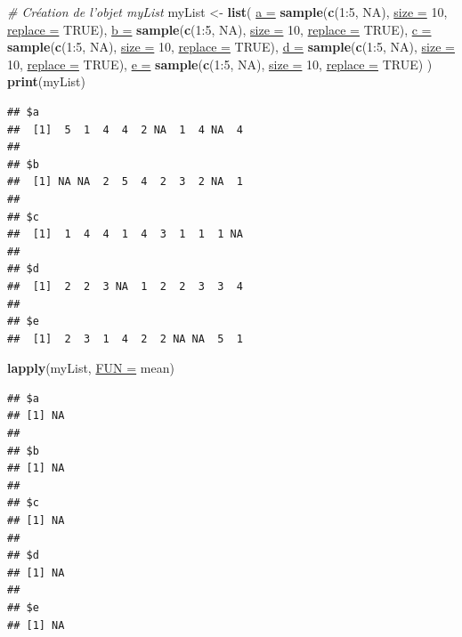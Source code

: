 \documentclass[twoside,symmetric]{book}
\newenvironment{Shaded}{}{}
\newcommand{\CommentTok}[1]{\textit{#1}}
\newcommand{\DataTypeTok}[1]{\underline{#1}}
\newcommand{\DecValTok}[1]{#1}
\newcommand{\KeywordTok}[1]{\textbf{#1}}
\newcommand{\NormalTok}[1]{#1}
\newcommand{\OperatorTok}[1]{#1}
\newcommand{\OtherTok}[1]{#1}
\newcommand{\StringTok}[1]{#1}
\begin{document}
\begin{Shaded}
\begin{Highlighting}[]
\CommentTok{# Création de l'objet myList}
\NormalTok{myList <-}\StringTok{ }\KeywordTok{list}\NormalTok{(}
  \DataTypeTok{a =} \KeywordTok{sample}\NormalTok{(}\KeywordTok{c}\NormalTok{(}\DecValTok{1}\OperatorTok{:}\DecValTok{5}\NormalTok{, }\OtherTok{NA}\NormalTok{), }\DataTypeTok{size =} \DecValTok{10}\NormalTok{, }\DataTypeTok{replace =} \OtherTok{TRUE}\NormalTok{), }
  \DataTypeTok{b =} \KeywordTok{sample}\NormalTok{(}\KeywordTok{c}\NormalTok{(}\DecValTok{1}\OperatorTok{:}\DecValTok{5}\NormalTok{, }\OtherTok{NA}\NormalTok{), }\DataTypeTok{size =} \DecValTok{10}\NormalTok{, }\DataTypeTok{replace =} \OtherTok{TRUE}\NormalTok{), }
  \DataTypeTok{c =} \KeywordTok{sample}\NormalTok{(}\KeywordTok{c}\NormalTok{(}\DecValTok{1}\OperatorTok{:}\DecValTok{5}\NormalTok{, }\OtherTok{NA}\NormalTok{), }\DataTypeTok{size =} \DecValTok{10}\NormalTok{, }\DataTypeTok{replace =} \OtherTok{TRUE}\NormalTok{), }
  \DataTypeTok{d =} \KeywordTok{sample}\NormalTok{(}\KeywordTok{c}\NormalTok{(}\DecValTok{1}\OperatorTok{:}\DecValTok{5}\NormalTok{, }\OtherTok{NA}\NormalTok{), }\DataTypeTok{size =} \DecValTok{10}\NormalTok{, }\DataTypeTok{replace =} \OtherTok{TRUE}\NormalTok{), }
  \DataTypeTok{e =} \KeywordTok{sample}\NormalTok{(}\KeywordTok{c}\NormalTok{(}\DecValTok{1}\OperatorTok{:}\DecValTok{5}\NormalTok{, }\OtherTok{NA}\NormalTok{), }\DataTypeTok{size =} \DecValTok{10}\NormalTok{, }\DataTypeTok{replace =} \OtherTok{TRUE}\NormalTok{)}
\NormalTok{)}
\KeywordTok{print}\NormalTok{(myList)}
\end{Highlighting}
\end{Shaded}

\begin{verbatim}
## $a
##  [1]  5  1  4  4  2 NA  1  4 NA  4
## 
## $b
##  [1] NA NA  2  5  4  2  3  2 NA  1
## 
## $c
##  [1]  1  4  4  1  4  3  1  1  1 NA
## 
## $d
##  [1]  2  2  3 NA  1  2  2  3  3  4
## 
## $e
##  [1]  2  3  1  4  2  2 NA NA  5  1
\end{verbatim}

\begin{Shaded}
\begin{Highlighting}[]
\KeywordTok{lapply}\NormalTok{(myList, }\DataTypeTok{FUN =}\NormalTok{ mean)}
\end{Highlighting}
\end{Shaded}

\begin{verbatim}
## $a
## [1] NA
## 
## $b
## [1] NA
## 
## $c
## [1] NA
## 
## $d
## [1] NA
## 
## $e
## [1] NA
\end{verbatim}
\end{document}
